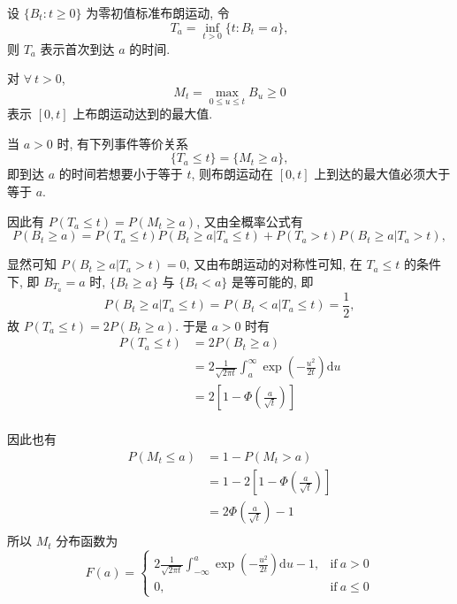 \documentclass[openany]{ctexbook}
\theoremstyle{kaiti}
\theoremstyle{normal}
\begin{document}
设 $\{B_t:t\geqslant0\}$ 为零初值标准布朗运动, 令
\begin{equation}
  T_a=\inf_{t>0}\{t:B_t=a\},
\end{equation}
 则 $T_a$ 表示首次到达 $a$ 的时间.

对 $\forall~t>0$,
\begin{equation}
  M_t=\max_{0\leqslant u\leqslant t}B_u\geqslant0
\end{equation}
 表示 $[0,t]$ 上布朗运动达到的最大值.

当 $a>0$ 时, 有下列事件等价关系
\begin{equation}
  \{T_a\leqslant t\}=\{M_t\geqslant a\},
\end{equation}
即到达 $a$ 的时间若想要小于等于 $t$, 则布朗运动在 $[0,t]$ 上到达的最大值必须大于等于 $a$.

因此有 $P(T_a\leqslant t)=P(M_t\geqslant a)$, 又由全概率公式有
\begin{equation}
  P(B_t\geqslant a)=P(T_a\leqslant t)P(B_t\geqslant a|T_a\leqslant t)+P(T_a>t)P(B_t\geqslant a|T_a>t),
\end{equation}

显然可知 $P(B_t\geqslant a|T_a>t)=0$, 又由布朗运动的对称性可知, 在 $T_a\leqslant t$ 的条件下, 即 $B_{T_a}=a$ 时, $\{B_t\geqslant a\}$ 与 $\{B_t<a\}$ 是等可能的, 即
\begin{equation}
  P(B_t\geqslant a|T_a\leqslant t)=P(B_t<a|T_a\leqslant t)=\frac{1}{2},
\end{equation}
故 $P(T_a\leqslant t)=2P(B_t\geqslant a)$. 于是 $a>0$ 时有
\begin{equation}
  \begin{aligned}
    P(T_a\leqslant t)
    &=2P(B_t\geqslant a)\\
    &=2\frac{1}{\sqrt{2\pi t}}\int_a^\infty\exp\left(-\frac{u^2}{2t}\right)\mathrm{d}u\\
    &=2\left[1-\Phi\left(\frac{a}{\sqrt{t}}\right)\right]\\
  \end{aligned}
\end{equation}

因此也有
\begin{equation}
  \begin{aligned}
    P(M_t\leqslant a)
    &=1-P(M_t>a)\\
    &=1-2\left[1-\Phi\left(\frac{a}{\sqrt{t}}\right)\right]\\
    &=2\Phi\left(\frac{a}{\sqrt{t}}\right)-1\\
  \end{aligned}
\end{equation}
所以 $M_t$ 分布函数为
\begin{equation}
  F(a)=
  \begin{cases}
    \displaystyle2\frac{1}{\sqrt{2\pi t}}\int_{-\infty}^a\exp\left(-\frac{u^2}{2t}\right)\mathrm{d}u-1,&\text{if}~a>0\\
    0,&\text{if}~a\leqslant0
  \end{cases}
\end{equation}
\end{document}
